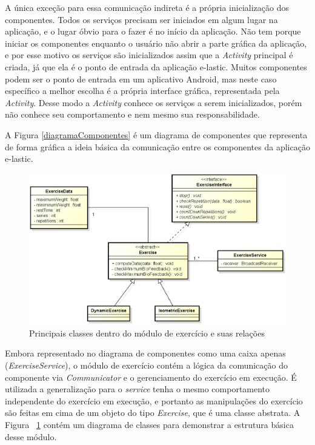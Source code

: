 A única exceção para essa comunicação indireta é a própria inicialização dos componentes. Todos os serviços precisam ser iniciados em algum lugar na aplicação, e o lugar óbvio para o fazer é no início da aplicação. Não tem porque iniciar os componentes enquanto o usuário não abrir a parte gráfica da aplicação, e por esse motivo os serviços são inicializados assim que a \textit{Activity} principal é criada, já que ela é o ponto de entrada da aplicação e-lastic. Muitos componentes podem ser o ponto de entrada em um aplicativo Android, mas neste caso específico a melhor escolha é a própria interface gráfica, representada pela \textit{Activity}. Desse modo a \textit{Activity} conhece os serviços a serem inicializados, porém não conhece seu comportamento e nem mesmo sua responsabilidade.

A Figura \ref{diagramaComponentes} é um diagrama de componentes que representa de forma gráfica a ideia básica da comunicação entre os componentes da aplicação e-lastic.

\begin{figure}[!htb]
\centering
\includegraphics [keepaspectratio=true,scale=0.60]{figuras/diagramaExercicios.eps}
\caption{Principais classes dentro do módulo de exercício e suas relações}
\label{diagramaExercicios}
\end{figure}

Embora representado no diagrama de componentes como uma caixa apenas (\textit{ExerciseService}), o módulo de exercício contém a lógica da comunicação do componente via \textit{Communicator} e o gerenciamento do exercício em execução. É utilizada a generalização para o \textit{service} tenha o mesmo comportamento independente do exercício em execução, e portanto as manipulações do exercício são feitas em cima de um objeto do tipo \textit{Exercise}, que é uma classe abstrata. A Figura ~\ref{diagramaExercicios} contém um diagrama de classes para demonstrar a estrutura básica desse módulo.

